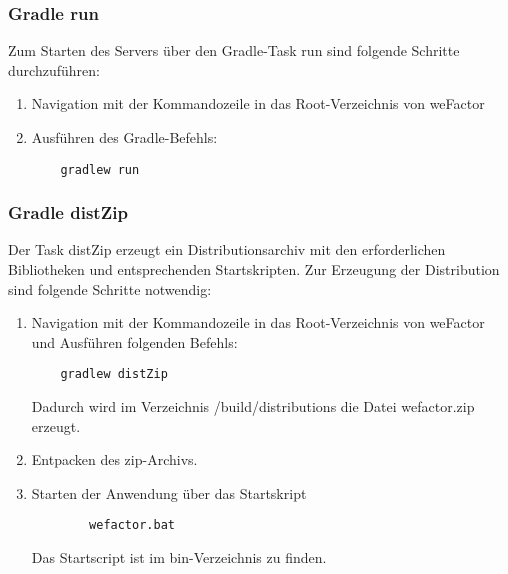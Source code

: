 \subsubsection{Gradle run}
Zum Starten des Servers über den Gradle-Task run sind folgende Schritte durchzuführen:
   \begin{enumerate}

    \item Navigation mit der Kommandozeile in das Root-Verzeichnis von weFactor
    \item Ausführen des Gradle-Befehls:
    \begin{lstlisting}
    gradlew run
    \end{lstlisting}

   \end{enumerate}

\subsubsection{Gradle distZip}
Der Task distZip erzeugt ein Distributionsarchiv mit den erforderlichen Bibliotheken und entsprechenden Startskripten. Zur Erzeugung der Distribution sind folgende Schritte notwendig:

   \begin{enumerate}

    \item Navigation mit der Kommandozeile in das Root-Verzeichnis von weFactor und Ausführen folgenden Befehls:
    \begin{lstlisting}
    gradlew distZip
    \end{lstlisting}
    Dadurch wird im Verzeichnis /build/distributions die Datei wefactor.zip erzeugt.
    \item Entpacken des zip-Archivs.
    \item Starten der Anwendung über das Startskript
        \begin{lstlisting}
        wefactor.bat
        \end{lstlisting}
        Das Startscript ist im bin-Verzeichnis zu finden.
        

   \end{enumerate}




